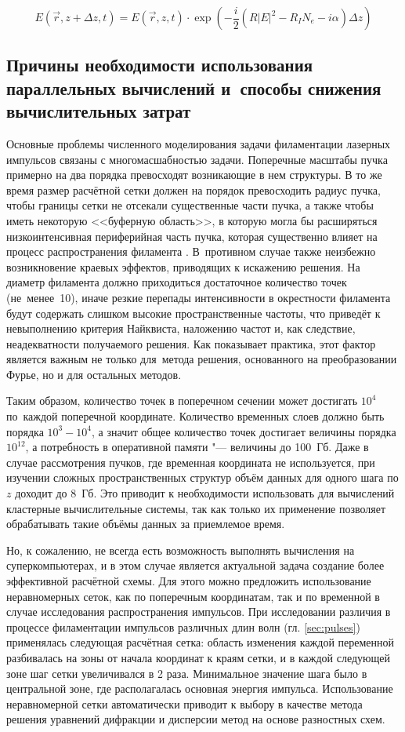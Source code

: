 \begin{equation}
E(\vec{r}, z + \Delta z, t) = E(\vec{r}, z, t) \cdot \exp\left( -\frac{i}{2} \left(R |E|^2 - R_{I} N_{e} - i \alpha \right) \Delta z \right)
\end{equation}


\subsection{Причины необходимости использования параллельных вычислений и~способы снижения вычислительных затрат}
Основные проблемы численного моделирования задачи филаментации лазерных импульсов связаны с многомасшабностью задачи.
Поперечные масштабы пучка примерно на два порядка превосходят возникающие в нем структуры.
В то же время размер расчётной сетки должен на порядок превосходить радиус пучка, чтобы границы сетки не отсекали существенные части пучка,
а также чтобы иметь некоторую <<буферную область>>, в которую могла бы расширяться низкоинтенсивная периферийная часть пучка,
которая существенно влияет на процесс распространения филамента \cite{KandidovShlenovKosarevaReview2009}.
В~противном случае также неизбежно возникновение краевых эффектов, приводящих к искажению решения.
На диаметр филамента должно приходиться достаточное количество точек (не~менее~10), иначе резкие перепады интенсивности в окрестности филамента
будут содержать слишком высокие пространственные частоты, что приведёт к невыполнению критерия Найквиста, наложению частот и, как следствие, неадекватности получаемого решения.
Как показывает практика, этот фактор является важным не только для~метода решения, основанного на преобразовании Фурье, но и для остальных методов.


Таким образом, количество точек в поперечном сечении может достигать $10^4$ по~каждой поперечной координате.
Количество временных слоев должно быть порядка $10^3-10^4$, а значит общее количество точек достигает величины порядка $10^{12}$,
а потребность в оперативной памяти "--- величины до 100~Гб. Даже в случае рассмотрения пучков, где временная координата не используется,
при изучении сложных пространственных структур объём данных для одного шага по $z$ доходит до 8~Гб. Это приводит к необходимости использовать для вычислений
кластерные вычислительные системы, так как только их применение позволяет обрабатывать такие объёмы данных за приемлемое время.


Но, к сожалению, не всегда есть возможность выполнять вычисления на суперкомпьютерах, и в этом случае является актуальной
задача создание более эффективной расчётной схемы. Для этого можно предложить использование неравномерных сеток, как по поперечным координатам,
так и по временной в случае исследования распространения импульсов. При исследовании различия в процессе филаментации импульсов
различных длин волн (гл. \ref{sec:pulses}) применялась следующая расчётная сетка: область изменения каждой переменной разбивалась на зоны от начала координат к краям сетки,
и в каждой следующей зоне шаг сетки увеличивался в 2 раза. Минимальное значение шага было в центральной зоне, где располагалась основная энергия импульса.
Использование неравномерной сетки автоматически приводит к выбору в качестве метода решения уравнений дифракции и дисперсии метод на основе разностных схем.

